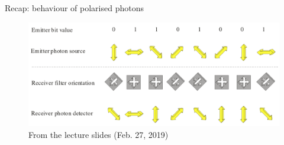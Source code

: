 \documentclass{beamer}
\begin{document}
\begin{frame}{Recap: behaviour of polarised photons}
\begin{figure}
    \centering
    \includegraphics[width=\textwidth, keepaspectratio]{presentation/res/photon-behaviour.png}
    \caption{From the lecture slides (Feb. 27, 2019)
    }
    \label{fig:my_label}
\end{figure}


\end{frame}
\end{document}
